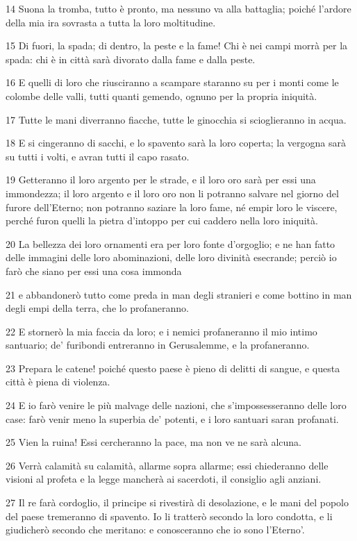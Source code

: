 \par 14 Suona la tromba, tutto è pronto, ma nessuno va alla battaglia; poiché l'ardore della mia ira sovrasta a tutta la loro moltitudine.
\par 15 Di fuori, la spada; di dentro, la peste e la fame! Chi è nei campi morrà per la spada: chi è in città sarà divorato dalla fame e dalla peste.
\par 16 E quelli di loro che riusciranno a scampare staranno su per i monti come le colombe delle valli, tutti quanti gemendo, ognuno per la propria iniquità.
\par 17 Tutte le mani diverranno fiacche, tutte le ginocchia si scioglieranno in acqua.
\par 18 E si cingeranno di sacchi, e lo spavento sarà la loro coperta; la vergogna sarà su tutti i volti, e avran tutti il capo rasato.
\par 19 Getteranno il loro argento per le strade, e il loro oro sarà per essi una immondezza; il loro argento e il loro oro non li potranno salvare nel giorno del furore dell'Eterno; non potranno saziare la loro fame, né empir loro le viscere, perché furon quelli la pietra d'intoppo per cui caddero nella loro iniquità.
\par 20 La bellezza dei loro ornamenti era per loro fonte d'orgoglio; e ne han fatto delle immagini delle loro abominazioni, delle loro divinità esecrande; perciò io farò che siano per essi una cosa immonda
\par 21 e abbandonerò tutto come preda in man degli stranieri e come bottino in man degli empi della terra, che lo profaneranno.
\par 22 E stornerò la mia faccia da loro; e i nemici profaneranno il mio intimo santuario; de' furibondi entreranno in Gerusalemme, e la profaneranno.
\par 23 Prepara le catene! poiché questo paese è pieno di delitti di sangue, e questa città è piena di violenza.
\par 24 E io farò venire le più malvage delle nazioni, che s'impossesseranno delle loro case: farò venir meno la superbia de' potenti, e i loro santuari saran profanati.
\par 25 Vien la ruina! Essi cercheranno la pace, ma non ve ne sarà alcuna.
\par 26 Verrà calamità su calamità, allarme sopra allarme; essi chiederanno delle visioni al profeta e la legge mancherà ai sacerdoti, il consiglio agli anziani.
\par 27 Il re farà cordoglio, il principe si rivestirà di desolazione, e le mani del popolo del paese tremeranno di spavento. Io li tratterò secondo la loro condotta, e li giudicherò secondo che meritano: e conosceranno che io sono l'Eterno'.

